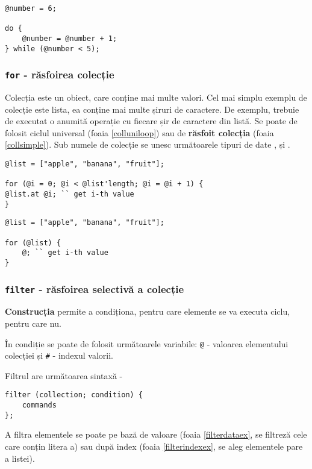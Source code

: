 \begin{lstlisting}[caption=Ciclu do while, label=dowhileex]
@number = 6;

do {
	@number = @number + 1;
} while (@number < 5);
\end{lstlisting}

\subsubsection{\lstinline`for` - răsfoirea colecție}

{Colecția} este un obiect, care conține mai multe valori. Cel mai simplu exemplu de colecție este lista, ea conține mai multe șiruri de caractere. De exemplu, trebuie de executat o anumită operație cu fiecare șir de caractere din listă. Se poate de folosit ciclul universal (foaia \ref{colluniloop}) sau de {\bf răsfoit colecția} (foaia \ref{collsimple}). Sub numele de colecție se unesc următoarele tipuri de date ,  și .
\begin{lstlisting}[caption=Răsfoirea colecție prin ciclu universal, label=colluniloop]
@list = ["apple", "banana", "fruit"];

for (@i = 0; @i < @list'length; @i = @i + 1) {
@list.at @i; `` get i-th value
}
\end{lstlisting}

\begin{lstlisting}[caption=Răsfoirea simplificată a colecției, label=collsimple]
@list = ["apple", "banana", "fruit"];

for (@list) {
	@; `` get i-th value
}
\end{lstlisting}

\subsubsection{\lstinline`filter` - răsfoirea selectivă a colecție}

{\bf Construcția } permite a condiționa, pentru care elemente se va executa ciclu, pentru care nu.

În condiție se poate de folosit următoarele variabile: \lstinline|@| - valoarea elementului colecției și \lstinline|#| - indexul valorii.

Filtrul are următoarea sintaxă -
\begin{lstlisting}[numbers=none]
filter (collection; condition) {
	commands
};
\end{lstlisting}

A filtra elementele se poate pe bază de valoare (foaia \ref{filterdataex}, se filtreză cele care conțin litera a) sau după index (foaia \ref{filterindexex}, se aleg elementele pare a listei).

